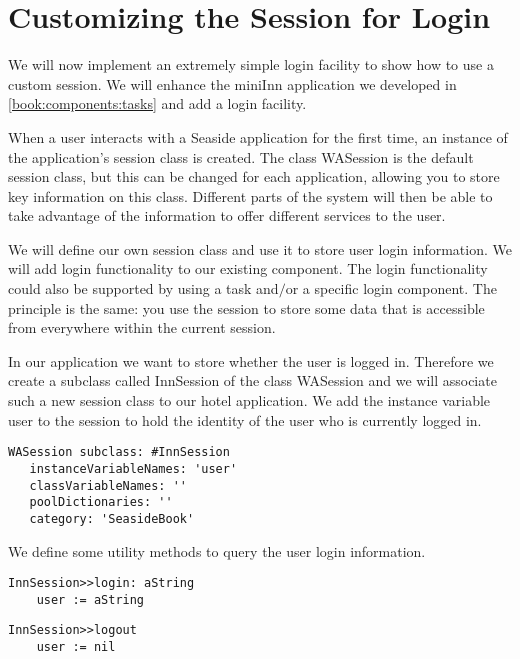 \documentclass[a4paper,10pt,twoside]{book}
\newcommand{\ct}[1]{{\small\ttfamily\textup{#1}}}
\begin{document}
\section{Customizing the Session for Login}
\label{book:inaction:session:customizesession}

We will now implement an extremely simple login facility to show how to use a custom session. We will enhance the \ct{miniInn} application we developed in \autoref{book:components:tasks} and add a login facility.

When a user interacts with a Seaside application for the first time, an instance of the application's session class is created. The class  \ct{WASession} is the default session class, but this can be changed for each application, allowing you to store key information on this class.  Different parts of the system will then be able to take advantage of the information to offer different services to the user.

We will define our own session class and use it to store user login information. We will add login functionality to our existing component.
 The login functionality could also be supported by using a task and$/$or a specific login component. The principle is the same: you use the session to store some data that is accessible from everywhere within the current session. 

In our application we want to store whether the user is logged in. Therefore we create a subclass called \ct{InnSession} of the class  \ct{WASession} and we will associate such a new session class to our hotel application. We add the instance variable \ct{user} to the session to hold the identity of the user who is currently logged in.

\begin{lstlisting}
WASession subclass: #InnSession
   instanceVariableNames: 'user'
   classVariableNames: ''
   poolDictionaries: ''
   category: 'SeasideBook'
\end{lstlisting}

We define some utility methods to query the user login information.

\begin{lstlisting}
InnSession>>login: aString
    user := aString
\end{lstlisting}

\begin{lstlisting}
InnSession>>logout
    user := nil
\end{lstlisting}
\end{document}
